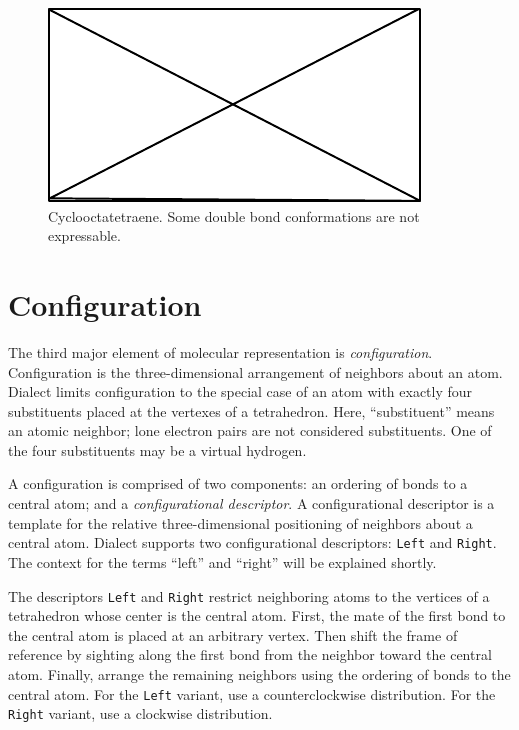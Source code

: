 \documentclass{article}
\def\ttt{\texttt}
\begin{document}
\begin{figure}
    \centering
    \includegraphics{filler}
    \caption{Cyclooctatetraene. Some double bond conformations are not expressable.}
    \label{fig:cyclooctatetraene}
\end{figure}

\section*{Configuration}

The third major element of molecular representation is \textit{configuration}. Configuration is the three-dimensional arrangement of neighbors about an atom. Dialect limits configuration to the special case of an atom with exactly four substituents placed at the vertexes of a tetrahedron. Here, \enquote{substituent} means an atomic neighbor; lone electron pairs are not considered substituents. One of the four substituents may be a virtual hydrogen.

A configuration is comprised of two components: an ordering of bonds to a central atom; and a \textit{configurational descriptor}. A configurational descriptor is a template for the relative three-dimensional positioning of neighbors about a central atom. Dialect supports two configurational descriptors: \ttt{Left} and \ttt{Right}. The context for the terms \enquote{left} and \enquote{right} will be explained shortly.

The descriptors \ttt{Left} and \ttt{Right} restrict neighboring atoms to the vertices of a tetrahedron whose center is the central atom. First, the mate of the first bond to the central atom is placed at an arbitrary vertex. Then shift the frame of reference by sighting along the first bond from the neighbor toward the central atom. Finally, arrange the remaining neighbors using the ordering of bonds to the central atom. For the \ttt{Left} variant, use a counterclockwise distribution. For the \ttt{Right} variant, use a clockwise distribution.
\end{document}
